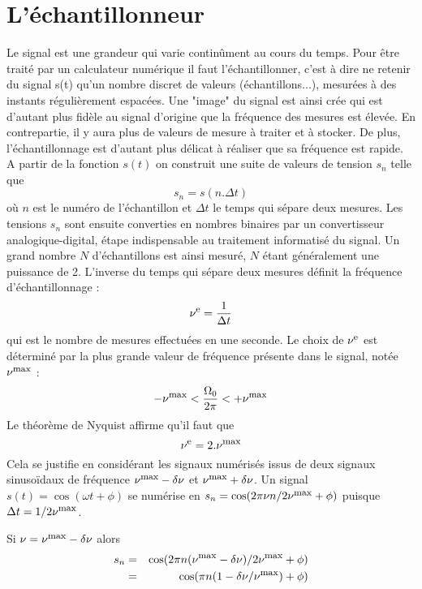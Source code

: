 \section{L'échantillonneur}
\label{sec:echantillon}
Le signal est une grandeur qui varie continûment au cours du temps.
Pour être traité par un calculateur numérique il faut l'échantillonner,
c'est à dire ne retenir du signal s(t)
qu'un nombre discret de valeurs (échantillons...), mesurées à des instants régulièrement
espacées.
Une "image" du signal est ainsi crée qui est d'autant plus fidèle au signal
d'origine que la fréquence des mesures est élevée.
En contrepartie, il y aura plus de valeurs de mesure à traiter et à stocker.
De plus, l'échantillonnage est d'autant plus délicat à
réaliser que sa fréquence est rapide.
A partir de la fonction $s(t)$ on construit une suite de
valeurs de tension $s_n$ telle que
\begin{equation}
s_n = s(n . \Delta t)
\end{equation}
où $n$ est le numéro de l'échantillon et $\Delta t$ le temps qui sépare deux mesures.
Les tensions $s_n$ sont ensuite converties en nombres binaires
par un convertisseur analogique-digital,
étape indispensable au traitement informatisé du signal.
Un grand nombre $N$ d'échantillons est ainsi mesuré,
$N$ étant généralement une puissance de 2.
L'inverse du temps qui sépare deux mesures définit la fréquence d'échantillonnage :
\begin{equation}
\nu^{\mbox{\footnotesize{e}}} = \frac{1}{\Delta t}
\end{equation}
qui est le nombre de mesures effectuées en une seconde.
Le choix de $\nu^{\mbox{\footnotesize{e}}}$ est déterminé par la
plus grande valeur de fréquence présente dans le signal, notée $\nu^{\mbox{\footnotesize{max}}}$ :
\begin{equation}
- \nu^{\mbox{\footnotesize{max}}}  < \frac{\Omega_0}{2\pi} < + \nu^{\mbox{\footnotesize{max}}}
\end{equation}
Le théorème de Nyquist affirme qu'il faut que
\begin{equation}
\nu^{\mbox{\footnotesize{e}}} = 2 . \nu^{\mbox{\footnotesize{max}}}
\end{equation}
Cela se justifie en considérant les signaux numérisés issus de deux signaux sinusoïdaux
de fréquence $\nu^{\mbox{\footnotesize{max}}} - \delta\nu$ et $\nu^{\mbox{\footnotesize{max}}} + \delta\nu$.
Un signal $s(t) = \cos(\omega t + \phi)$ se numérise en
$s_n = \cos(2\pi\nu n/2\nu^{\mbox{\footnotesize{max}}} + \phi)$ puisque $\Delta t = 1/2\nu^{\mbox{\footnotesize{max}}}$.

Si $\nu = \nu^{\mbox{\footnotesize{max}}} - \delta\nu$ alors
\begin{eqnarray}
s_n & = & \cos(2\pi n (\nu^{\mbox{\footnotesize{max}}} - \delta\nu)/2\nu^{\mbox{\footnotesize{max}}} + \phi) \\
& = & \cos(\pi n(1-\delta\nu/\nu^{\mbox{\footnotesize{max}}}) + \phi)
\end{eqnarray}

